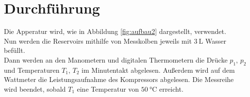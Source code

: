 \section{Durchführung}
\label{sec:Durchführung}
Die Apperatur wird, wie in Abbildung \ref{fig:aufbau2} dargestellt, verwendet.\\
Nun werden die Reservoirs mithilfe von Messkolben jeweils mit $\SI{3}{\liter}$ Wasser befüllt.\\
Dann werden an den Manometern und digitalen Thermometern die Drücke $p_1$, $p_2$ und Temperaturen
$T_1$, $T_2$ im Minutentakt abgelesen. Außerdem wird auf dem Wattmeter die Leistungsaufnahme des Kompressors abgelesen.
Die Messreihe wird beendet, sobald $T_1$ eine Temperatur von $\SI{50}{\celsius}$ erreicht.